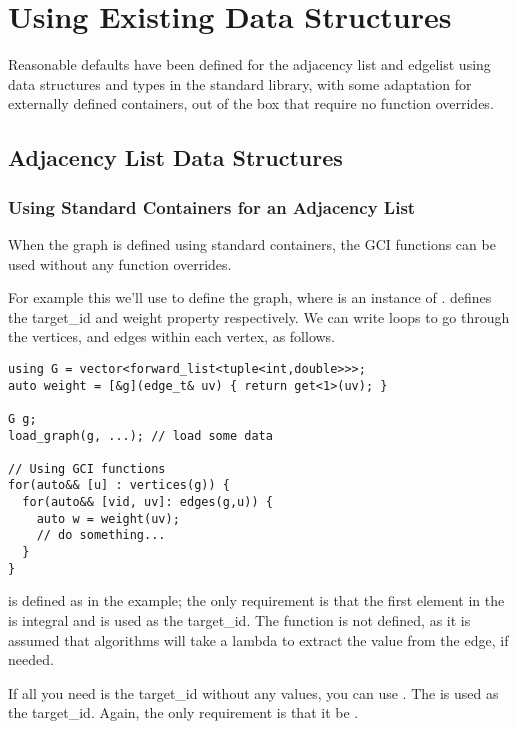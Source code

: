 \section{Using Existing Data Structures}
Reasonable defaults have been defined for the adjacency list and edgelist using data structures and types
in the standard library, with some adaptation for externally defined containers, out of the box that require
no function overrides.

\subsection{Adjacency List Data Structures}

\subsubsection{Using Standard Containers for an Adjacency List}
When the graph is defined using standard containers, the GCI functions can be used without any function overrides.

For example this we'll use  to define the graph, where  
is an instance of .  defines the target\_id and weight property respectively. We
can write loops to go through the vertices, and edges within each vertex, as follows.

\begin{lstlisting}
using G = vector<forward_list<tuple<int,double>>>;
auto weight = [&g](edge_t& uv) { return get<1>(uv); }

G g;
load_graph(g, ...); // load some data

// Using GCI functions
for(auto&& [u] : vertices(g)) {
  for(auto&& [vid, uv]: edges(g,u)) {
    auto w = weight(uv);
    // do something...
  }
}
\end{lstlisting}

 is defined as  in the example; the only requirement is that the first element
in the  is integral and is used as the target\_id. The  function is not defined, as it is
assumed that algorithms will take a lambda to extract the value from the edge, if needed.

If all you need is the target\_id without any values, you can use . The 
is used as the target\_id. Again, the only requirement is that it be .

